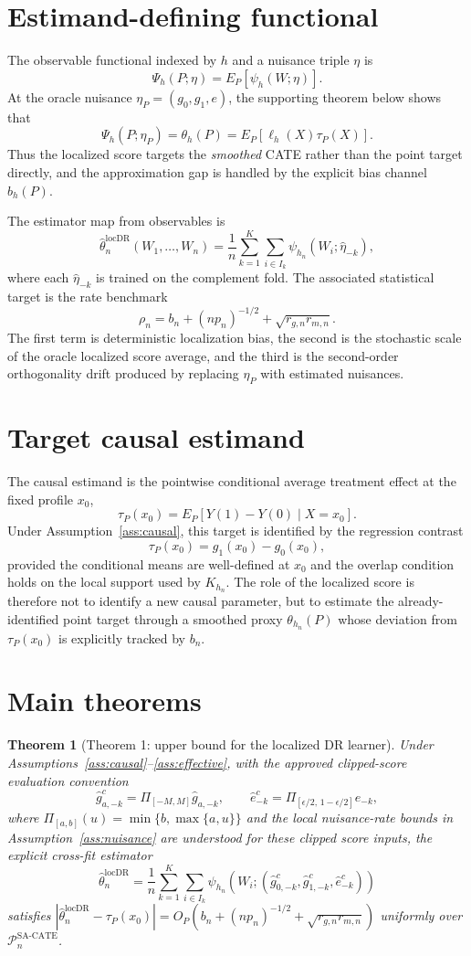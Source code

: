 \documentclass[11pt]{article}
\theoremstyle{definition}
\theoremstyle{plain}
\newtheorem{theorem}{Theorem}
\theoremstyle{remark}
\begin{document}
\section{Estimand-defining functional}
The observable functional indexed by $h$ and a nuisance triple $\eta$ is
\[
  \Psi_h(P;\eta)=E_P[\psi_h(W;\eta)].
\]
At the oracle nuisance $\eta_P=(g_0,g_1,e)$, the supporting theorem below shows that
\[
  \Psi_h(P;\eta_P)=\theta_h(P)=E_P[\ell_h(X)\tau_P(X)].
\]
Thus the localized score targets the \emph{smoothed} CATE rather than the point target directly, and
the approximation gap is handled by the explicit bias channel $b_h(P)$.

The estimator map from observables is
\[
  \hat\theta_n^{\mathrm{locDR}}(W_1,\dots,W_n)
  =\frac{1}{n}\sum_{k=1}^K\sum_{i\in I_k}\psi_{h_n}(W_i;\hat\eta_{-k}),
\]
where each $\hat\eta_{-k}$ is trained on the complement fold. The associated statistical target is the
rate benchmark
\[
  \rho_n=b_n+(n p_n)^{-1/2}+\sqrt{r_{g,n}r_{m,n}}.
\]
The first term is deterministic localization bias, the second is the stochastic scale of the oracle
localized score average, and the third is the second-order orthogonality drift produced by replacing
$\eta_P$ with estimated nuisances.

\section{Target causal estimand}
The causal estimand is the pointwise conditional average treatment effect at the fixed profile $x_0$,
\[
  \tau_P(x_0)=E_P[Y(1)-Y(0)\mid X=x_0].
\]
Under Assumption~\ref{ass:causal}, this target is identified by the regression contrast
\[
  \tau_P(x_0)=g_1(x_0)-g_0(x_0),
\]
provided the conditional means are well-defined at $x_0$ and the overlap condition holds on the local
support used by $K_{h_n}$. The role of the localized score is therefore not to identify a new causal
parameter, but to estimate the already-identified point target through a smoothed proxy
$\theta_{h_n}(P)$ whose deviation from $\tau_P(x_0)$ is explicitly tracked by $b_n$.

\section{Main theorems}
\begin{theorem}[Theorem 1: upper bound for the localized DR learner]\label{thm:upper}
Under Assumptions~\ref{ass:causal}--\ref{ass:effective}, with the approved clipped-score evaluation convention
\[
\hat g^c_{a,-k}=\Pi_{[-M,M]}\hat g_{a,-k},\qquad \hat e^c_{-k}=\Pi_{[\epsilon/2,\,1-\epsilon/2]}\hat e_{-k},
\]
where $\Pi_{[a,b]}(u)=\min\{b,\max\{a,u\}\}$ and the local nuisance-rate bounds in Assumption~\ref{ass:nuisance} are understood for these clipped score inputs, the explicit cross-fit estimator
\[
\hat\theta_n^{\mathrm{locDR}} = \frac{1}{n}\sum_{k=1}^K\sum_{i\in I_k} \psi_{h_n}\!\left(W_i;(\hat g^c_{0,-k},\hat g^c_{1,-k},\hat e^c_{-k})\right)
\]
satisfies $\left|\hat\theta_n^{\mathrm{locDR}}-\tau_P(x_0)\right|=O_P\!\left(b_n+(n p_n)^{-1/2}+\sqrt{r_{g,n}r_{m,n}}\right)$ uniformly over $\mathcal{P}_n^{\mathrm{SA\text{-}CATE}}$.
\end{theorem}
\end{document}
